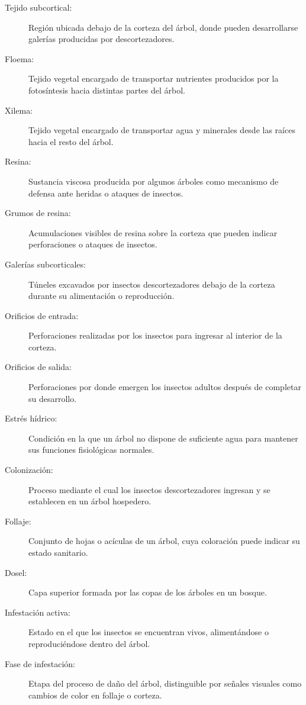 \begin{description}
    \item[Tejido subcortical:] Región ubicada debajo de la corteza del árbol, donde pueden desarrollarse galerías producidas por descortezadores.
    \item[Floema:] Tejido vegetal encargado de transportar nutrientes producidos por la fotosíntesis hacia distintas partes del árbol.
    \item[Xilema:] Tejido vegetal encargado de transportar agua y minerales desde las raíces hacia el resto del árbol.
    \item[Resina:] Sustancia viscosa producida por algunos árboles como mecanismo de defensa ante heridas o ataques de insectos.
    \item[Grumos de resina:] Acumulaciones visibles de resina sobre la corteza que pueden indicar perforaciones o ataques de insectos.
    \item[Galerías subcorticales:] Túneles excavados por insectos descortezadores debajo de la corteza durante su alimentación o reproducción.
    \item[Orificios de entrada:] Perforaciones realizadas por los insectos para ingresar al interior de la corteza.
    \item[Orificios de salida:] Perforaciones por donde emergen los insectos adultos después de completar su desarrollo.
    \item[Estrés hídrico:] Condición en la que un árbol no dispone de suficiente agua para mantener sus funciones fisiológicas normales.
    \item[Colonización:] Proceso mediante el cual los insectos descortezadores ingresan y se establecen en un árbol hospedero.
    \item[Follaje:] Conjunto de hojas o acículas de un árbol, cuya coloración puede indicar su estado sanitario.
    \item[Dosel:] Capa superior formada por las copas de los árboles en un bosque.
    \item[Infestación activa:] Estado en el que los insectos se encuentran vivos, alimentándose o reproduciéndose dentro del árbol.
    \item[Fase de infestación:] Etapa del proceso de daño del árbol, distinguible por señales visuales como cambios de color en follaje o corteza.
\end{description}
